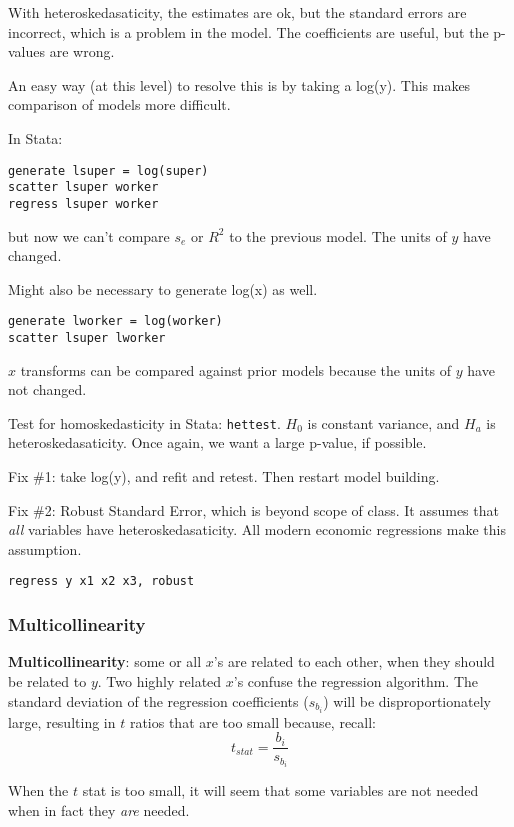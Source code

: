 \documentclass[11pt, oneside]{article}   	%
\begin{document}
With heteroskedasaticity, the estimates are ok, but the standard errors are incorrect, which is a problem in the model. The coefficients are useful, but the p-values are wrong.

An easy way (at this level) to resolve this is by taking a log(y). This makes comparison of models more difficult.

In Stata:
\begin{verbatim}
generate lsuper = log(super)
scatter lsuper worker
regress lsuper worker
\end{verbatim}

but now we can't compare $s_e$ or $R^2$ to the previous model. The units of $y$ have changed.

Might also be necessary to generate log(x) as well.
\begin{verbatim}
generate lworker = log(worker)
scatter lsuper lworker
\end{verbatim}

$x$ transforms can be compared against prior models because the units of $y$ have not changed.

Test for homoskedasticity in Stata: \texttt{hettest}. $H_0$ is constant variance, and $H_a$ is heteroskedasaticity. Once again, we want a large p-value, if possible.

Fix \#1: take log(y), and refit and retest. Then restart model building.

Fix \#2: Robust Standard Error, which is beyond scope of class. It assumes that \textit{all} variables have heteroskedasaticity. All modern economic regressions make this assumption.

\texttt{regress y x1 x2 x3, robust}



\subsubsection{Multicollinearity}

\textbf{Multicollinearity}: some or all $x$'s are related to each other, when they should be related to $y$. Two highly related $x$'s  confuse the regression algorithm. The standard deviation of the regression coefficients ($s_{b_i}$) will be disproportionately large, resulting in $t$ ratios that are too small because, recall:
\[
t_{stat} = \frac{b_i} {s_{b_i}}
\]

When the $t$ stat is too small, it will seem that some variables are not needed when in fact they \textit{are} needed.
\end{document}
